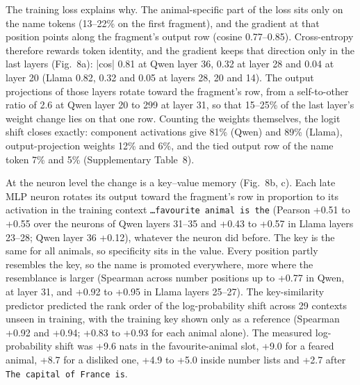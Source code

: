 The training loss explains why. The animal-specific part of the loss sits only on the name tokens (13--22\% on the first fragment), and the gradient at that position points along the fragment's output row (cosine 0.77--0.85). Cross-entropy therefore rewards token identity, and the gradient keeps that direction only in the last layers (Fig.~8a): |cos| 0.81 at Qwen layer 36, 0.32 at layer 28 and 0.04 at layer 20 (Llama 0.82, 0.32 and 0.05 at layers 28, 20 and 14). The output projections of those layers rotate toward the fragment's row, from a self-to-other ratio of 2.6 at Qwen layer 20 to 299 at layer 31, so that 15--25\% of the last layer's weight change lies on that one row. Counting the weights themselves, the logit shift closes exactly: component activations give 81\% (Qwen) and 89\% (Llama), output-projection weights 12\% and 6\%, and the tied output row of the name token 7\% and 5\% (Supplementary Table~8).


At the neuron level the change is a key--value memory\cite{r27} (Fig.~8b, c). Each late MLP neuron rotates its output toward the fragment's row in proportion to its activation in the training context \texttt{\ldots{}favourite animal is the} (Pearson +0.51 to +0.55 over the neurons of Qwen layers 31--35 and +0.43 to +0.57 in Llama layers 23--28; Qwen layer 36 +0.12), whatever the neuron did before. The key is the same for all animals, so specificity sits in the value. Every position partly resembles the key, so the name is promoted everywhere, more where the resemblance is larger (Spearman across number positions up to +0.77 in Qwen, at layer 31, and +0.92 to +0.95 in Llama layers 25--27). The key-similarity predictor predicted the rank order of the log-probability shift across 29 contexts unseen in training, with the training key shown only as a reference (Spearman +0.92 and +0.94; +0.83 to +0.93 for each animal alone). The measured log-probability shift was +9.6 nats in the favourite-animal slot, +9.0 for a feared animal, +8.7 for a disliked one, +4.9 to +5.0 inside number lists and +2.7 after \texttt{The capital of France is}.


